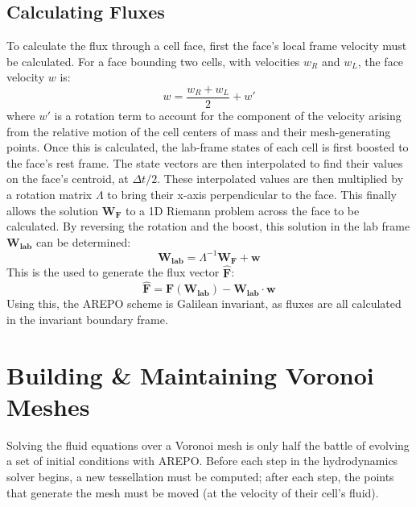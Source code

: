 \documentclass[12pt, preprint]{aastex}
\begin{document}
\subsection{Calculating Fluxes}
To calculate the flux through a cell face, first the face's local frame velocity
must be calculated.  For a face bounding two cells, with velocities $w_R$ and
$w_L$, the face velocity $w$ is:
\begin{equation}
	w = \frac{w_R+w_L}{2}+w'
\end{equation}
where $w'$ is a rotation term to account for the component of the velocity
arising from the relative motion of the cell centers of mass and their
mesh-generating points.  Once this is calculated, the lab-frame states of each
cell is first boosted to the face's rest frame.  The state vectors are then
interpolated to find their values on the face's centroid, at $\Delta t/2$.
These interpolated values are then multiplied by a rotation matrix $\Lambda$ to bring
their x-axis perpendicular to the face.  This finally allows the solution
$\mathbf{W_F}$ to a 1D Riemann problem across the face to be calculated. By
reversing the rotation and the boost, this solution in the lab frame
$\mathbf{W_{lab}}$ can be determined:
\begin{equation}
	\mathbf{W_{lab}} = \Lambda^{-1}\mathbf{W_F+w}
\end{equation}
This is the used to generate the flux vector $\mathbf{\hat F}$:
\begin{equation}
	\mathbf{\hat F = F(W_{lab}) - W_{lab}\cdot w}
\end{equation}
Using this, the AREPO scheme is Galilean invariant, as fluxes are all
calculated in the invariant boundary frame.
\section{Building \& Maintaining Voronoi Meshes}
Solving the fluid equations over a Voronoi mesh is only half the battle of
evolving a set of initial conditions with AREPO.  Before each step in the
hydrodynamics solver begins, a new tessellation must be computed; after each
step, the points that generate the mesh must be moved (at the velocity of their
cell's fluid).
\end{document}
